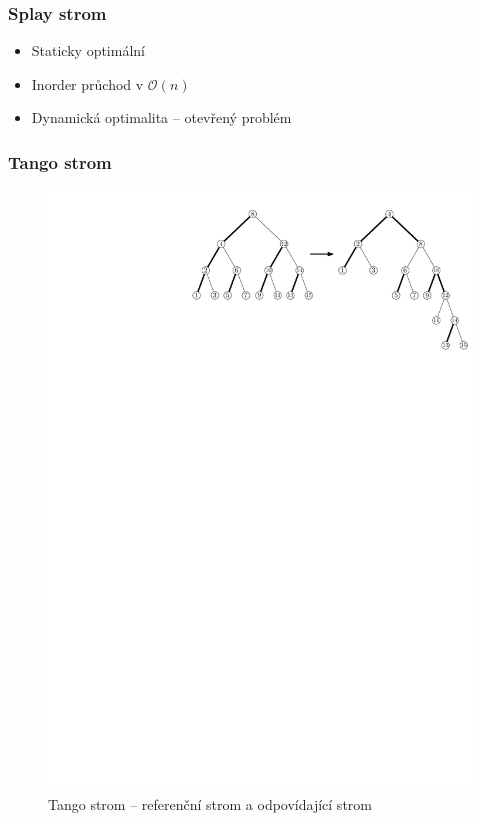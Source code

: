 \documentclass{beamer}
\begin{document}
\begin{frame}
\frametitle{Splay strom}
\begin{itemize}
\item Staticky optimální
\item Inorder průchod v $\mathcal O(n)$
\item Dynamická optimalita -- otevřený problém
\end{itemize}
\end{frame}

\begin{frame}
\frametitle{Tango strom}


\begin{figure}[h!]

  \centering
  \includegraphics[width=.9\linewidth]{tango}
\caption{Tango strom -- referenční strom a odpovídající  strom} 

\label{obr:cut_tango} 
 
\end{figure}
\end{frame}
\end{document}
